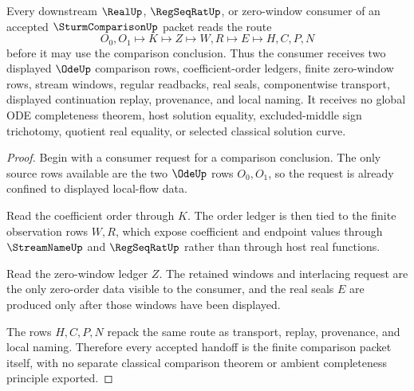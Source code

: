 \begin{theorem}\label{thm:sturm-comparison-zero-order-handoff}
Every downstream $\RealUp$, $\RegSeqRatUp$, or zero-window consumer of an accepted $\SturmComparisonUp$ packet reads the route
$$
O_0,O_1 \longmapsto K \longmapsto Z \longmapsto W,R \longmapsto E \longmapsto H,C,P,N
$$
before it may use the comparison conclusion. Thus the consumer receives two displayed $\OdeUp$ comparison rows, coefficient-order ledgers, finite zero-window rows, stream windows, regular readbacks, real seals, componentwise transport, displayed continuation replay, provenance, and local naming. It receives no global ODE completeness theorem, host solution equality, excluded-middle sign trichotomy, quotient real equality, or selected classical solution curve.
\end{theorem}
\begin{proof}
Begin with a consumer request for a comparison conclusion. The only source rows available are the two $\OdeUp$ rows $O_0,O_1$, so the request is already confined to displayed local-flow data.

Read the coefficient order through $K$. The order ledger is then tied to the finite observation rows $W,R$, which expose coefficient and endpoint values through $\StreamNameUp$ and $\RegSeqRatUp$ rather than through host real functions.

Read the zero-window ledger $Z$. The retained windows and interlacing request are the only zero-order data visible to the consumer, and the real seals $E$ are produced only after those windows have been displayed.

The rows $H,C,P,N$ repack the same route as transport, replay, provenance, and local naming. Therefore every accepted handoff is the finite comparison packet itself, with no separate classical comparison theorem or ambient completeness principle exported.
\end{proof}


